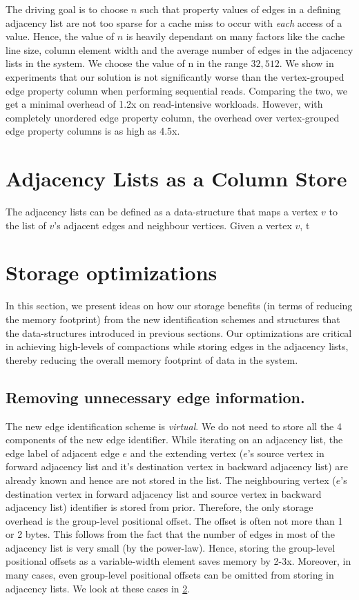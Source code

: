 The driving goal is to choose $n$ such that property values of edges in a defining adjacency list are not too sparse for a cache miss to occur with \emph{each} access of a value. Hence, the value of $n$ is heavily dependant on many factors like the cache line size, column element width and the average number of edges in the adjacency lists in the system. We choose the value of n in the range $32, 512$. We show in experiments that our solution is not significantly worse than the vertex-grouped edge property column when performing sequential reads. Comparing the two, we get a minimal overhead of 1.2x on read-intensive workloads. However, with completely unordered edge property column, the overhead over vertex-grouped edge property columns is as high as 4.5x.

\section{Adjacency Lists as a Column Store}
\label{sec:adjacency-lists}

The adjacency lists can be defined as a data-structure that maps a vertex $v$ to the list of $v$'s adjacent edges and neighbour vertices. Given a vertex $v$, t




\section{Storage optimizations}
\label{sec:storage-optimizations}

In this section, we present ideas on how our storage benefits (in terms of reducing the memory footprint) from the new identification schemes and structures that the data-structures introduced in previous sections. Our optimizations are critical in achieving high-levels of compactions while storing edges in the adjacency lists, thereby reducing the overall memory footprint of data in the system.

\subsection{Removing unnecessary edge information.}

The new edge identification scheme is \emph{virtual}. We do not need to store all the 4 components of the new edge identifier. While iterating on an adjacency list, the edge label of adjacent edge $e$ and the extending vertex ($e$'s source vertex in forward adjacency list and it's destination vertex in backward adjacency list) are already known and hence are not stored in the list. The neighbouring vertex ($e$'s destination vertex in forward adjacency list and source vertex in backward adjacency list) identifier is stored from prior. Therefore, the only storage overhead is the group-level positional offset. The offset is often not more than 1 or 2 bytes. This follows from the fact that the number of edges in most of the adjacency list is very small (by the power-law). Hence, storing the group-level positional offsets as a variable-width element saves memory by 2-3x. Moreover, in many cases, even group-level positional offsets can be omitted from storing in adjacency lists. We look at these cases in \ref{sec:storage-optimizations}.

